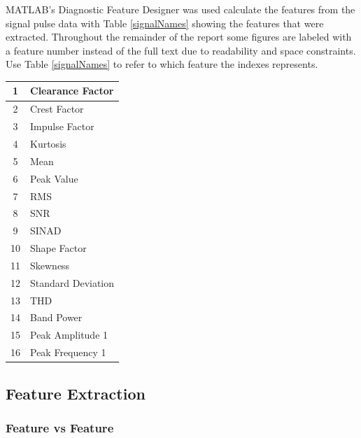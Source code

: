 \documentclass[]{article}
\begin{document}
MATLAB's Diagnostic Feature Designer was used calculate the features from the signal pulse data with Table \ref{signalNames} showing the features that were extracted. Throughout the remainder of the report some figures are labeled with a feature number instead of the full text due to readability and space constraints. Use Table \ref{signalNames} to refer to which feature the indexes represents.
\begin{center}
\label{featureNames}
\begin{tabular}{ |c|l| }
 \hline
 1 & Clearance Factor \\
 \hline
 2 & Crest Factor \\
 \hline
 3 & Impulse Factor \\
 \hline
 4 & Kurtosis \\
 \hline
 5 & Mean \\
 \hline
 6 & Peak Value \\
 \hline
 7 & \gls{RMS} \\ 
 \hline              
 8 & \gls{SNR}  \\
 \hline
 9 & \gls{SINAD}  \\
 \hline
 10 & Shape Factor \\
 \hline
 11 & Skewness \\
 \hline
 12 & Standard Deviation \\
 \hline
 13 & \gls{THD} \\
 \hline
 14 & Band Power \\
 \hline
 15 & Peak Amplitude 1 \\
 \hline
 16 & Peak Frequency 1 \\
 \hline
\end{tabular}
\end{center}

\subsection{Feature Extraction}
\subsubsection*{Feature vs Feature}
\end{document}
